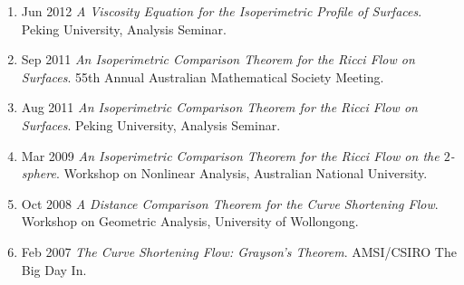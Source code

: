 \documentclass[12pt]{amsart}
\begin{document}
\begin{enumerate}[resume]
\item Jun 2012 \emph{A Viscosity Equation for the Isoperimetric Profile of Surfaces}. Peking University, Analysis Seminar.
\item Sep 2011 \emph{An Isoperimetric Comparison Theorem for the Ricci Flow on Surfaces}. 55th Annual Australian Mathematical Society Meeting.
\item Aug 2011 \emph{An Isoperimetric Comparison Theorem for the Ricci Flow on Surfaces}. Peking University, Analysis Seminar.
\item Mar 2009 \emph{An Isoperimetric Comparison Theorem for the Ricci Flow on the $2$-sphere}. Workshop on Nonlinear Analysis, Australian National University.
\item Oct 2008 \emph{A Distance Comparison Theorem for the Curve Shortening Flow}. Workshop on Geometric Analysis, University of Wollongong.
\item Feb 2007 \emph{The Curve Shortening Flow: Grayson's Theorem}. AMSI/CSIRO The Big Day In.
\end{enumerate}
\end{document}
